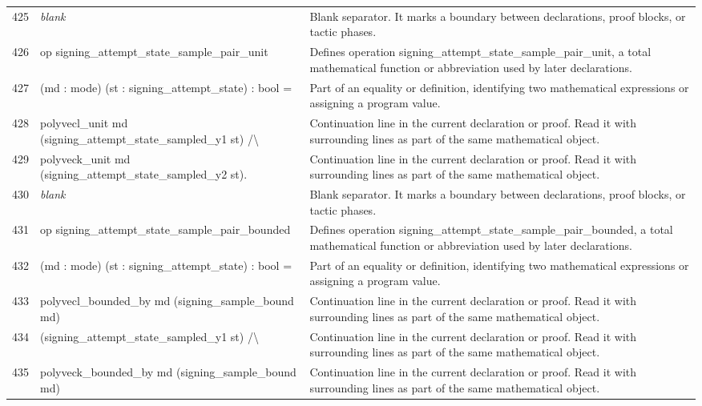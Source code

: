 \documentclass[10pt]{article}
\begin{document}
\begin{longtable}{r L{0.53\textwidth} L{0.37\textwidth}}
425 & {\ttfamily\scriptsize \emph{blank}} & Blank separator.  It marks a boundary between declarations, proof blocks, or tactic phases. \\
426 & {\ttfamily\scriptsize op signing\_attempt\_state\_sample\_pair\_unit} & Defines operation signing\_attempt\_state\_sample\_pair\_unit, a total mathematical function or abbreviation used by later declarations. \\
427 & {\ttfamily\scriptsize    (md : mode) (st : signing\_attempt\_state) : bool =} & Part of an equality or definition, identifying two mathematical expressions or assigning a program value. \\
428 & {\ttfamily\scriptsize   polyvecl\_unit md (signing\_attempt\_state\_sampled\_y1 st) /\textbackslash{}} & Continuation line in the current declaration or proof.  Read it with surrounding lines as part of the same mathematical object. \\
429 & {\ttfamily\scriptsize   polyveck\_unit md (signing\_attempt\_state\_sampled\_y2 st).} & Continuation line in the current declaration or proof.  Read it with surrounding lines as part of the same mathematical object. \\
430 & {\ttfamily\scriptsize \emph{blank}} & Blank separator.  It marks a boundary between declarations, proof blocks, or tactic phases. \\
431 & {\ttfamily\scriptsize op signing\_attempt\_state\_sample\_pair\_bounded} & Defines operation signing\_attempt\_state\_sample\_pair\_bounded, a total mathematical function or abbreviation used by later declarations. \\
432 & {\ttfamily\scriptsize    (md : mode) (st : signing\_attempt\_state) : bool =} & Part of an equality or definition, identifying two mathematical expressions or assigning a program value. \\
433 & {\ttfamily\scriptsize   polyvecl\_bounded\_by md (signing\_sample\_bound md)} & Continuation line in the current declaration or proof.  Read it with surrounding lines as part of the same mathematical object. \\
434 & {\ttfamily\scriptsize     (signing\_attempt\_state\_sampled\_y1 st) /\textbackslash{}} & Continuation line in the current declaration or proof.  Read it with surrounding lines as part of the same mathematical object. \\
435 & {\ttfamily\scriptsize   polyveck\_bounded\_by md (signing\_sample\_bound md)} & Continuation line in the current declaration or proof.  Read it with surrounding lines as part of the same mathematical object. \\

\end{longtable}
\end{document}
